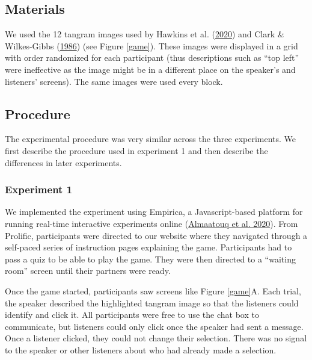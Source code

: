 \documentclass[
  english,
  a4paper,
]{article}
\begin{document}
\hypertarget{materials}{%
\subsection{Materials}\label{materials}}

We used the 12 tangram images used by Hawkins et al. (\protect\hyperlink{ref-hawkinsCharacterizingDynamicsLearning2020}{2020}) and Clark \& Wilkes-Gibbs (\protect\hyperlink{ref-clarkReferringCollaborativeProcess1986}{1986}) (see Figure \ref{game}). These images were displayed in a grid with order randomized for each participant (thus descriptions such as ``top left'' were ineffective as the image might be in a different place on the speaker's and listeners' screens). The same images were used every block.

\hypertarget{procedure}{%
\subsection{Procedure}\label{procedure}}

The experimental procedure was very similar across the three experiments. We first describe the procedure used in experiment 1 and then describe the differences in later experiments.

\hypertarget{experiment-1}{%
\subsubsection{Experiment 1}\label{experiment-1}}

We implemented the experiment using Empirica, a Javascript-based platform for running real-time interactive experiments online (\protect\hyperlink{ref-almaatouqEmpiricaVirtualLab2020}{Almaatouq et al. 2020}). From Prolific, participants were directed to our website where they navigated through a self-paced series of instruction pages explaining the game. Participants had to pass a quiz to be able to play the game. They were then directed to a ``waiting room'' screen until their partners were ready.

Once the game started, participants saw screens like Figure \ref{game}A. Each trial, the speaker described the highlighted tangram image so that the listeners could identify and click it. All participants were free to use the chat box to communicate, but listeners could only click once the speaker had sent a message. Once a listener clicked, they could not change their selection. There was no signal to the speaker or other listeners about who had already made a selection.
\end{document}
